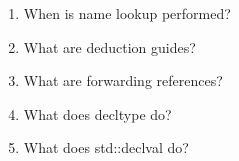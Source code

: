 \begin{enumerate}
\item
When is name lookup performed?

\item
What are deduction guides?

\item
What are forwarding references?

\item
What does decltype do?

\item
What does std::declval do?
\end{enumerate}